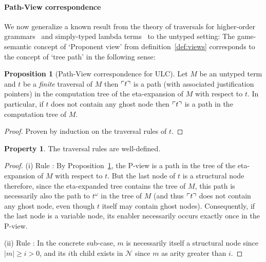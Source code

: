 \documentclass{article}
\theoremstyle{definition}
\newtheorem{property}{Property}[section]
\newtheorem{proposition}{Proposition}[section]
\newcommand\Nodes{\mathcal{N}}%
\begin{document}
\paragraph{Path-View correspondence}
We now generalize a known result from the theory of traversals for higher-order grammars~\cite{Ong2006} and simply-typed lambda terms~\cite[Proposition 4.29]{BlumPhd} to the untyped setting: The game-semantic concept of `Proponent view' from definition~\ref{def:views} corresponds to the concept of `tree path' in the following sense:

\begin{proposition}[Path-View correspondence for ULC]
\label{prop:pathview_ulc}
Let $M$ be an untyped term and $t$ be a \emph{finite} traversal of $M$ then
$\ulcorner t \urcorner$ is a path (with associated justification pointers) in the computation tree of the eta-expansion of $M$ with respect to $t$.
In particular, if $t$ does not contain any ghost node then $\ulcorner t \urcorner$ is a path in the computation tree of $M$.
\end{proposition}
\begin{proof}
Proven by induction on the traversal rules of $t$.
\end{proof}

\begin{property}
The traversal rules are well-defined.
\end{property}
\begin{proof}
(i) Rule : By Proposition~\ref{prop:pathview_ulc}, the P-view is a path in the tree of the eta-expansion of $M$ with respect to $t$. But the last node of $t$ is a structural node therefore, since the eta-expanded tree contains the tree of $M$, this path is necessarily also the path to $t^\omega$ in the tree of $M$ (and thus $\ulcorner t \urcorner$ does not contain any ghost node, even though $t$ itself may contain ghost nodes).
 Consequently, if the last node is a variable node, its enabler necessarily occurs exactly once in the P-view.

(ii) Rule : In the concrete sub-case, $m$ is necessarily itself a structural node since $|m|\geq i>0$, and its $i$th child exists in $\Nodes$ since $m$ as arity greater than $i$.
\end{proof}
\end{document}
